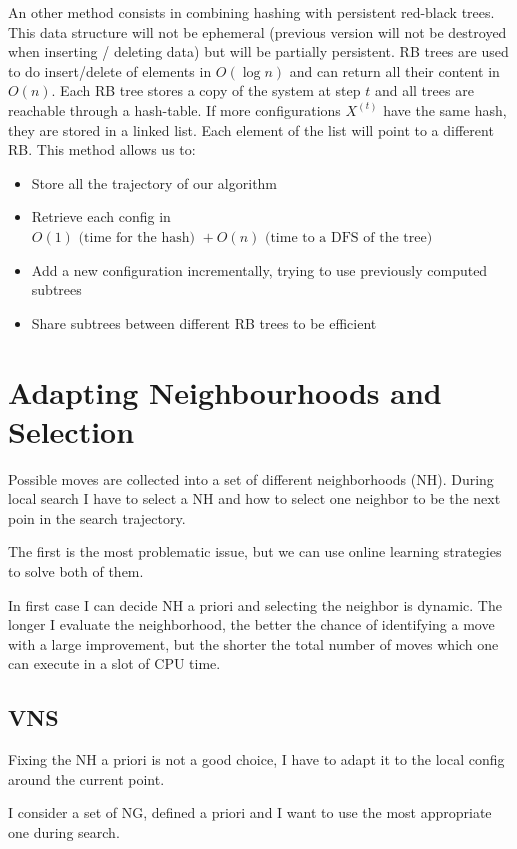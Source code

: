 \documentclass[10pt]{article}
\begin{document}
An other method consists in combining hashing with persistent red-black trees. This data structure will not be ephemeral (previous version will not be destroyed when inserting / deleting data) but will be partially persistent. RB trees are used to do insert/delete of elements in $O(\log n)$ and can return all their content in $O(n)$. Each RB tree stores a copy of the system at step $t$ and all trees are reachable through a hash-table. If more configurations $X^{(t)}$ have the same hash, they are stored in a linked list. Each element of the list will point to a different RB. This method allows us to:
\begin{itemize}
\item{Store all the trajectory of our algorithm}
\item{Retrieve each config in $O(1) \text{ (time for the hash) } + O(n) \text{ (time to a DFS of the tree) }$ }
\item{Add a new configuration incrementally, trying to use previously computed subtrees}
\item{Share subtrees between different RB trees to be efficient}
\end{itemize}

\section{Adapting Neighbourhoods and Selection}
Possible moves are collected into a set of different
neighborhoods (NH). During local search I have to select a 
NH and how to select one neighbor to be the next poin in the search trajectory.

The first is the most problematic issue, but we can use online learning strategies to solve both of them.

In first case I can decide NH a priori and selecting the neighbor is dynamic. The longer I evaluate the neighborhood, the better the chance of
identifying a move with a large improvement, but the shorter the total number of moves which one can execute in a slot of CPU time.

\subsection{VNS}
Fixing the NH a priori is not a good choice, I have to adapt it to the local config around the current point. 

I consider a set of NG, defined a priori and I want to use the most appropriate one during search. 
\end{document}

